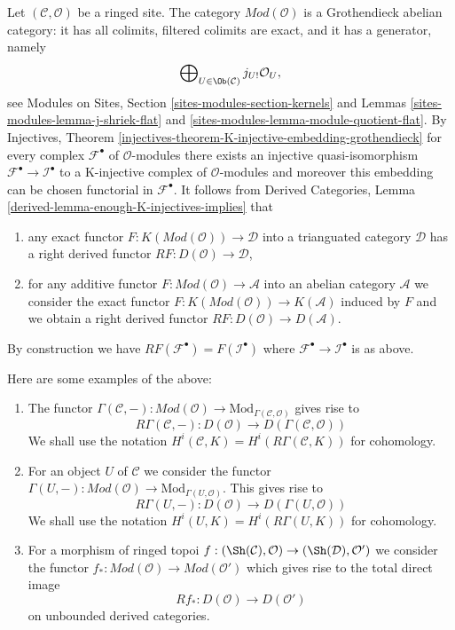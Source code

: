 \noindent
Let $(\mathcal{C}, \mathcal{O})$ be a ringed site.
The category $\textit{Mod}(\mathcal{O})$ is a Grothendieck
abelian category: it has all colimits,
filtered colimits are exact, and it has a generator, namely
$$
\bigoplus\nolimits_{U \in \Ob(\mathcal{C})} j_{U!}\mathcal{O}_U,
$$
see Modules on Sites, Section \ref{sites-modules-section-kernels} and
Lemmas \ref{sites-modules-lemma-j-shriek-flat} and
\ref{sites-modules-lemma-module-quotient-flat}.
By Injectives, Theorem
\ref{injectives-theorem-K-injective-embedding-grothendieck}
for every complex $\mathcal{F}^\bullet$ of $\mathcal{O}$-modules
there exists an injective quasi-isomorphism
$\mathcal{F}^\bullet \to \mathcal{I}^\bullet$ to a K-injective complex
of $\mathcal{O}$-modules and moreover this embedding can be chosen
functorial in $\mathcal{F}^\bullet$. It follows from
Derived Categories, Lemma \ref{derived-lemma-enough-K-injectives-implies}
that
\begin{enumerate}
\item any exact functor $F : K(\textit{Mod}(\mathcal{O})) \to \mathcal{D}$
into a trianguated category $\mathcal{D}$ has a right derived functor
$RF : D(\mathcal{O}) \to \mathcal{D}$,
\item for any additive functor
$F : \textit{Mod}(\mathcal{O}) \to \mathcal{A}$
into an abelian category $\mathcal{A}$ we consider the exact functor
$F : K(\textit{Mod}(\mathcal{O})) \to K(\mathcal{A})$ induced by $F$
and we obtain a right derived functor
$RF : D(\mathcal{O}) \to D(\mathcal{A})$.
\end{enumerate}
By construction we have $RF(\mathcal{F}^\bullet) = F(\mathcal{I}^\bullet)$
where $\mathcal{F}^\bullet \to \mathcal{I}^\bullet$ is as above.

\medskip\noindent
Here are some examples of the above:
\begin{enumerate}
\item The functor $\Gamma(\mathcal{C}, -) : \textit{Mod}(\mathcal{O}) \to
\text{Mod}_{\Gamma(\mathcal{C}, \mathcal{O})}$ gives rise to
$$
R\Gamma(\mathcal{C}, -) :
D(\mathcal{O})
\longrightarrow
D(\Gamma(\mathcal{C}, \mathcal{O}))
$$
We shall use the notation
$H^i(\mathcal{C}, K) = H^i(R\Gamma(\mathcal{C}, K))$ for cohomology.
\item For an object $U$ of $\mathcal{C}$ we consider the functor
$\Gamma(U, -) : \textit{Mod}(\mathcal{O}) \to
\text{Mod}_{\Gamma(U, \mathcal{O})}$. This gives rise to
$$
R\Gamma(U, -) : D(\mathcal{O}) \to D(\Gamma(U, \mathcal{O}))
$$
We shall use the notation
$H^i(U, K) = H^i(R\Gamma(U, K))$ for cohomology.
\item For a morphism of ringed topoi
$f : (\Sh(\mathcal{C}), \mathcal{O}) \to (\Sh(\mathcal{D}), \mathcal{O}')$
we consider the functor
$f_* : \textit{Mod}(\mathcal{O}) \to \textit{Mod}(\mathcal{O}')$
which gives rise to the total direct image
$$
Rf_* : D(\mathcal{O}) \longrightarrow D(\mathcal{O}')
$$
on unbounded derived categories.
\end{enumerate}

